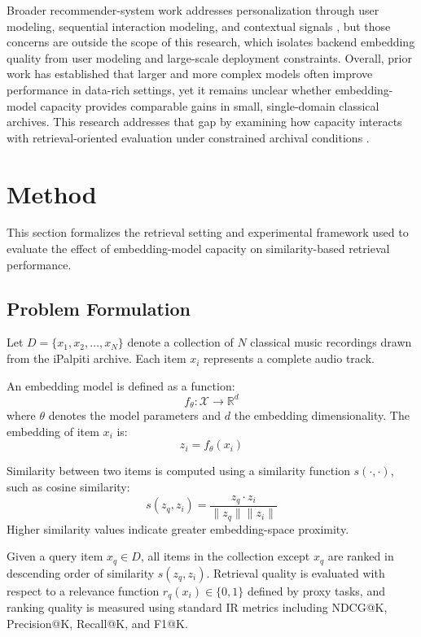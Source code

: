 \documentclass{article}
\begin{document}
Broader recommender-system work addresses personalization through user modeling, sequential
interaction modeling, and contextual signals \cite{lin2025, abbattista2024, schedl2021}, but those
concerns are outside the scope of this research, which isolates backend embedding quality from user
modeling and large-scale deployment constraints. Overall, prior work has established that larger and
more complex models often improve performance in data-rich settings, yet it remains unclear whether
embedding-model capacity provides comparable gains in small, single-domain classical archives. This
research addresses that gap by examining how capacity interacts with retrieval-oriented evaluation
under constrained archival conditions \cite{tamm2024, krichene2020, canamares2020}.

\section{Method}\label{sec:method}\label{ch:problem}\label{ch:methodology}
This section formalizes the retrieval setting and experimental framework used to evaluate the effect of embedding-model capacity on similarity-based retrieval performance.

\subsection{Problem Formulation}

Let $D = \{x_1, x_2, \dots, x_N\}$ denote a collection of $N$ classical music recordings drawn from
the iPalpiti archive. Each item $x_i$ represents a complete audio track.

An embedding model is defined as a function:
\[
f_\theta : \mathcal{X} \rightarrow \mathbb{R}^d
\]
where $\theta$ denotes the model parameters and $d$ the embedding dimensionality. The embedding of
item $x_i$ is:
\[
z_i = f_\theta(x_i)
\]

Similarity between two items is computed using a similarity function $s(\cdot,\cdot)$, such as cosine
similarity:
\[
s(z_q, z_i) = \frac{z_q \cdot z_i}{\|z_q\|\|z_i\|}
\]
Higher similarity values indicate greater embedding-space proximity.

Given a query item $x_q \in D$, all items in the collection except $x_q$ are ranked in descending
order of similarity $s(z_q, z_i)$. Retrieval quality is evaluated with respect to a relevance
function $r_q(x_i) \in \{0,1\}$ defined by proxy tasks, and ranking quality is measured using
standard IR metrics including NDCG@K, Precision@K, Recall@K, and F1@K.
\end{document}
